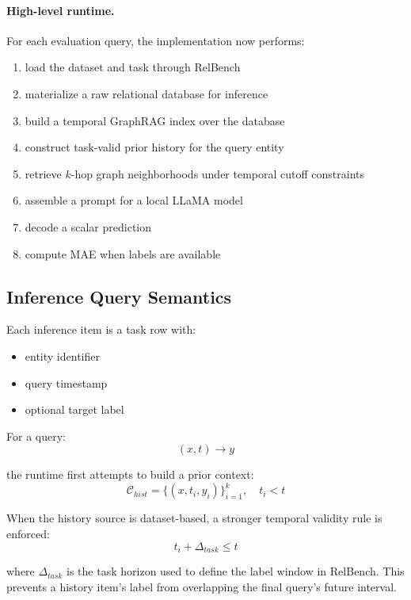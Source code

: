 \documentclass[11pt]{article}
\begin{document}
\paragraph{High-level runtime.}
For each evaluation query, the implementation now performs:
\begin{enumerate}
\item load the dataset and task through RelBench
\item materialize a raw relational database for inference
\item build a temporal GraphRAG index over the database
\item construct task-valid prior history for the query entity
\item retrieve $k$-hop graph neighborhoods under temporal cutoff constraints
\item assemble a prompt for a local LLaMA model
\item decode a scalar prediction
\item compute MAE when labels are available
\end{enumerate}

\subsection{Inference Query Semantics}

Each inference item is a task row with:
\begin{itemize}
\item entity identifier
\item query timestamp
\item optional target label
\end{itemize}

For a query:
\begin{equation}
(x,t) \rightarrow y
\end{equation}

the runtime first attempts to build a prior context:
\begin{equation}
\mathcal{C}_{hist} = \{(x,t_i,y_i)\}_{i=1}^{k}, \quad t_i < t
\end{equation}

When the history source is dataset-based, a stronger temporal validity rule is enforced:
\begin{equation}
t_i + \Delta_{task} \le t
\end{equation}

where $\Delta_{task}$ is the task horizon used to define the label window in RelBench. This prevents a history item's label from overlapping the final query's future interval.
\end{document}
